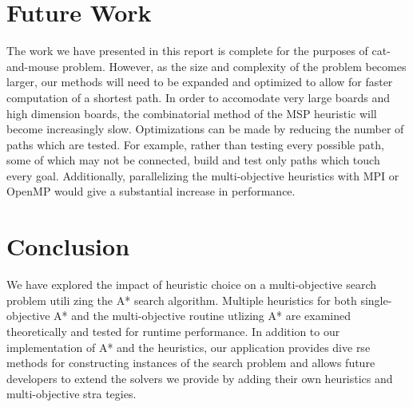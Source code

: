 \documentclass[12pt, conference, compsocconf]{IEEEtran}
\begin{document}
\section{Future Work}
The work we have presented in this report is complete for the purposes of
cat-and-mouse problem.  However, as the size and complexity of the problem
becomes larger, our methods will need to be expanded and optimized to allow for
faster computation of a shortest path.  In order to accomodate very large
boards and high dimension boards, the combinatorial method of the MSP heuristic
will become increasingly slow.  Optimizations can be made by reducing the
number of paths which are tested.  For example, rather than testing every
possible path, some of which may not be connected, build and test only paths
which touch every goal.  Additionally, parallelizing the multi-objective
heuristics with MPI or OpenMP would give a substantial increase in performance.

\section{Conclusion}
We have explored the impact of heuristic choice on a multi-objective search
problem utili zing the A* search algorithm.  Multiple heuristics for both
single-objective A* and the multi-objective routine utlizing A* are examined
theoretically and tested for runtime performance.  In addition to our
implementation of A* and the heuristics, our application provides dive rse
methods for constructing instances of the search problem and allows future
developers to extend the solvers we provide by adding their own heuristics and
multi-objective stra tegies.


%
%
\end{document}
